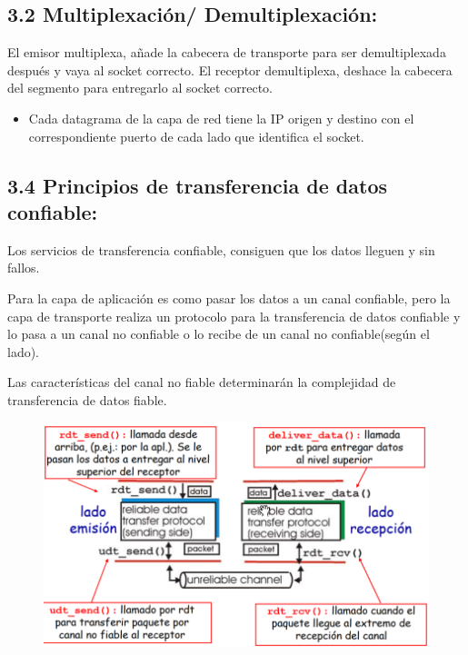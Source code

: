 \documentclass[12pt, twoside, openright]{report} %
\begin{document}
\subsection{3.2 Multiplexación/ Demultiplexación:}


El emisor multiplexa, añade la cabecera de transporte para ser
demultiplexada después y vaya al socket correcto.
El receptor demultiplexa, deshace la cabecera del segmento para
entregarlo al socket correcto.

\begin{itemize}
	\item Cada datagrama de la capa de red tiene la IP origen y destino con
	      el correspondiente puerto de cada lado que identifica el socket.
\end{itemize}

\subsection{3.4 Principios de transferencia de datos confiable:}

Los servicios de transferencia confiable, consiguen que los datos
lleguen y sin fallos.

Para la capa de aplicación es como pasar los datos a un canal
confiable, pero la capa de transporte realiza un protocolo para la
transferencia de datos confiable y lo pasa a un canal no confiable o
lo recibe de un canal no confiable(según el lado).

Las características del canal no fiable determinarán la complejidad
de transferencia de datos fiable.

\begin{figure}[H]
	{\includegraphics[scale=.35]{Untitled 9.png}}
\end{figure}
\end{document}
